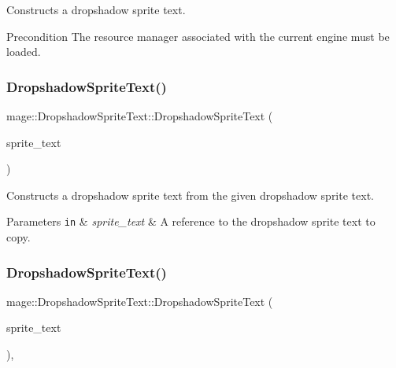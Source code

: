 Constructs a dropshadow sprite text.

\begin{DoxyPrecond}{Precondition}
The resource manager associated with the current engine must be loaded. 
\end{DoxyPrecond}
\hypertarget{classmage_1_1_dropshadow_sprite_text_af0a9422a32ed8962d6c691fe76f44c30}{}\label{classmage_1_1_dropshadow_sprite_text_af0a9422a32ed8962d6c691fe76f44c30} 
\subsubsection{\texorpdfstring{Dropshadow\+Sprite\+Text()}{DropshadowSpriteText()}\hspace{0.1cm}{\footnotesize\ttfamily [2/3]}}
{\footnotesize\ttfamily mage\+::\+Dropshadow\+Sprite\+Text\+::\+Dropshadow\+Sprite\+Text (\begin{DoxyParamCaption}\item[{const \hyperlink{classmage_1_1_dropshadow_sprite_text}{Dropshadow\+Sprite\+Text} \&}]{sprite\+\_\+text }\end{DoxyParamCaption})\hspace{0.3cm}{\ttfamily [default]}}

Constructs a dropshadow sprite text from the given dropshadow sprite text.


\begin{DoxyParams}[1]{Parameters}
\mbox{\tt in}  & {\em sprite\+\_\+text} & A reference to the dropshadow sprite text to copy. \\
\hline
\end{DoxyParams}
\hypertarget{classmage_1_1_dropshadow_sprite_text_a79367c23991f486a8548aac6fce36691}{}\label{classmage_1_1_dropshadow_sprite_text_a79367c23991f486a8548aac6fce36691} 
\subsubsection{\texorpdfstring{Dropshadow\+Sprite\+Text()}{DropshadowSpriteText()}\hspace{0.1cm}{\footnotesize\ttfamily [3/3]}}
{\footnotesize\ttfamily mage\+::\+Dropshadow\+Sprite\+Text\+::\+Dropshadow\+Sprite\+Text (\begin{DoxyParamCaption}\item[{\hyperlink{classmage_1_1_dropshadow_sprite_text}{Dropshadow\+Sprite\+Text} \&\&}]{sprite\+\_\+text }\end{DoxyParamCaption})\hspace{0.3cm}{\ttfamily [default]}, {\ttfamily [noexcept]}}

